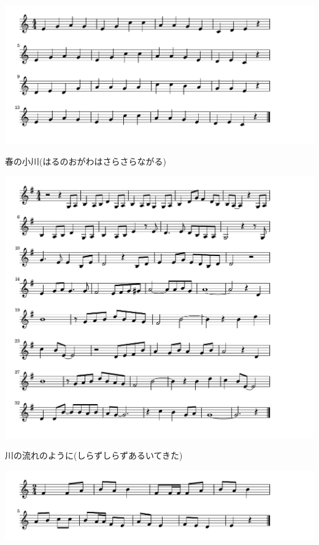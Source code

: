 \documentclass[a4paper]{ltjsarticle}
\begin{document}
\vspace{10mm}

\includegraphics[clip]{harunoogawa_crop.pdf}

\vspace{-10mm}

\parindent=50pt 
春の小川(はるのおがわはさらさらながる)
\parindent=10pt

\vspace{10mm}

\includegraphics[clip]{kawanonagare_crop.pdf}

\vspace{-10mm}

\parindent=50pt 
川の流れのように(しらずしらずあるいてきた)
\parindent=10pt

\vspace{10mm}


\includegraphics[clip]{usagi_crop.pdf}
\end{document}
